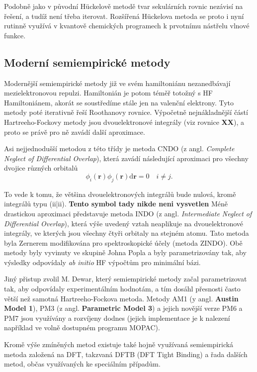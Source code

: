 Podobně jako v původní H\"{u}ckelově metodě tvar sekulárních rovnic nezávisí na řešení, a tudíž není třeba iterovat. Rozšířená H\"{u}ckelova metoda se proto i nyní rutinně využívá v kvantově chemických programech k prvotnímu nástřelu vlnové funkce.

\subsection{Moderní semiempirické metody}

Modernější semiempirické metody již ve svém hamiltoniánu nezanedbávají mezielektronovou repulzi.
Hamiltonián je potom téměř totožný s HF Hamiltoniánem, akorát se soustředíme stále jen na valenční elektrony. Tyto metody poté iterativně řeší Roothanovy rovnice. Výpočetně nejnákladnější částí Hartreeho-Fockovy metody jsou dvouelektronové integrály (viz rovnice \textbf{XX}), a proto se právě pro ně zavádí další aproximace.

Asi nejjednodušší metodou z této třídy je metoda CNDO (z angl. \textit{Complete Neglect of Differential Overlap}), která zavádí následující aproximaci pro všechny dvojice různých orbitalů
\begin{equation}
\phi_i(\mathbf{r}) \phi_j(\mathbf{r}) \mathrm{d}\mathbf{r} = 0 \quad i\neq j.
\end{equation}

To vede k tomu, že většina dvouelektronových integrálů bude nulová, kromě integrálů typu (ii|ii). \textbf{Tento symbol tady nikde neni vysvetlen} Méně drastickou aproximaci představuje metoda INDO (z angl. \textit{Intermediate Neglect of Differential Overlap}), která výše uvedený vztah neaplikuje na dvouelektronové integrály, ve kterých jsou všechny čtyři orbitaly na stejném atomu. Tato metoda byla Zernerem modifikována pro spektroskopické účely (metoda ZINDO).
Obě metody byly vyvinuty ve skupině Johna Popla a byly parametrizovány tak, aby výsledky odpovídaly \textit{ab initio} HF výpočtům pro minimální bázi. 
 
Jiný přistup zvolil M. Dewar, který semiempirické metody začal parametrizovat tak, aby odpovídaly experimentálním hodnotám, a tím dosáhl přesnosti často větší než samotná Hartreeho-Fockova metoda. Metody AM1 (y angl. \textbf{Austin Model 1}), PM3 (z angl. \textbf{Parametric Model 3}) a jejich novější verze PM6 a PM7 jsou využívány a rozvíjeny dodnes (jejich implementace je k nalezení například ve volně dostupném programu MOPAC).

Kromě výše zmíněných metod existuje také hojně využívaná semiempirická metoda založená na DFT, takzvaná DFTB (DFT Tight Binding) a řada dalších metod, občas využívaných ke speciálním případům.


 
